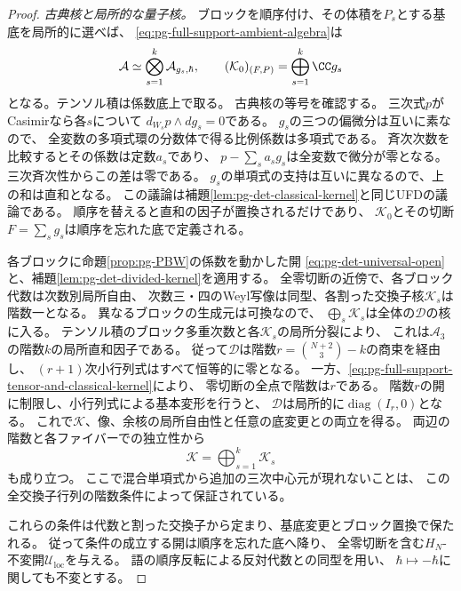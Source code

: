 \begin{proof}
\emph{古典核と局所的な量子核。}
ブロックを順序付け、その体積を$P_s$とする基底を局所的に選べば、
\eqref{eq:pg-full-support-ambient-algebra}は
\begin{equation}
 \mathcal A\simeq\bigotimes_{s=1}^k\mathcal A_{g_s,\hbar},
 \qquad
 (\mathcal K_0)_{(F,P)}=\bigoplus_{s=1}^k\CC g_s
 \label{eq:pg-full-support-tensor-and-classical-kernel}
\end{equation}
となる。テンソル積は係数底上で取る。
古典核の等号を確認する。
三次式$p$がCasimirなら各$s$について
$d_{W_s}p\wedge d g_s=0$である。
$g_s$の三つの偏微分は互いに素なので、
全変数の多項式環の分数体で得る比例係数は多項式である。
斉次次数を比較するとその係数は定数$a_s$であり、
$p-\sum_sa_sg_s$は全変数で微分が零となる。
三次斉次性からこの差は零である。
$g_s$の単項式の支持は互いに異なるので、上の和は直和となる。
この議論は補題\ref{lem:pg-det-classical-kernel}と同じUFDの議論である。
順序を替えると直和の因子が置換されるだけであり、
$\mathcal K_0$とその切断$F=\sum_sg_s$は順序を忘れた底で定義される。

各ブロックに命題\ref{prop:pg-PBW}の係数を動かした開
\eqref{eq:pg-det-universal-open}と、補題\ref{lem:pg-det-divided-kernel}を適用する。
全零切断の近傍で、各ブロック代数は次数別局所自由、
次数三・四のWeyl写像は同型、各割った交換子核$\mathcal K_s$は階数一となる。
異なるブロックの生成元は可換なので、
$\bigoplus_s\mathcal K_s$は全体の$\mathcal D$の核に入る。
テンソル積のブロック多重次数と各$\mathcal K_s$の局所分裂により、
これは$\mathcal A_3$の階数$k$の局所直和因子である。
従って$\mathcal D$は階数$r=\binom{N+2}{3}-k$の商束を経由し、
$(r+1)$次小行列式はすべて恒等的に零となる。
一方、\eqref{eq:pg-full-support-tensor-and-classical-kernel}により、
零切断の全点で階数は$r$である。
階数$r$の開に制限し、小行列式による基本変形を行うと、
$\mathcal D$は局所的に$\operatorname{diag}(I_r,0)$となる。
これで$\mathcal K$、像、余核の局所自由性と任意の底変更との両立を得る。
両辺の階数と各ファイバーでの独立性から
\begin{equation}
 \mathcal K=\bigoplus_{s=1}^k\mathcal K_s
 \label{eq:pg-full-support-quantum-kernel-sum}
\end{equation}
も成り立つ。
ここで混合単項式から追加の三次中心元が現れないことは、
この全交換子行列の階数条件によって保証されている。

これらの条件は代数と割った交換子から定まり、基底変更とブロック置換で保たれる。
従って条件の成立する開は順序を忘れた底へ降り、
全零切断を含む$H_N$-不変開$\mathcal U_{\mathrm{loc}}$を与える。
語の順序反転による反対代数との同型を用い、
$\hbar\mapsto-\hbar$に関しても不変とする。


\end{proof}
